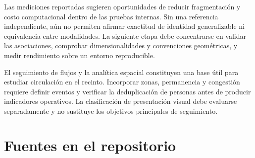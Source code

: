 \documentclass[12pt,letterpaper]{article}
\begin{document}
Las mediciones reportadas sugieren oportunidades de reducir fragmentación y costo computacional dentro de las pruebas internas. Sin una referencia independiente, aún no permiten afirmar exactitud de identidad generalizable ni equivalencia entre modalidades. La siguiente etapa debe concentrarse en validar las asociaciones, comprobar dimensionalidades y convenciones geométricas, y medir rendimiento sobre un entorno reproducible.

El seguimiento de flujos y la analítica espacial constituyen una base útil para estudiar circulación en el recinto. Incorporar zonas, permanencia y congestión requiere definir eventos y verificar la deduplicación de personas antes de producir indicadores operativos. La clasificación de presentación visual debe evaluarse separadamente y no sustituye los objetivos principales de seguimiento.

\section{Fuentes en el repositorio}

\begingroup\small\setlength{\tabcolsep}{4pt}\renewcommand{\arraystretch}{1.2}
\end{document}
